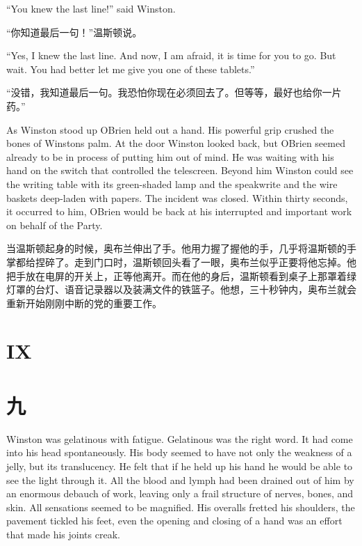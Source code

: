 \begin{paracol}{2}
\switchcolumn*

``You knew the last line!'' said Winston.

\switchcolumn

``你知道最后一句！''温斯顿说。

\switchcolumn*

``Yes, I knew the last line. And now, I am afraid, it is time for you to
go. But wait. You had better let me give you one of these tablets.''

\switchcolumn

``没错，我知道最后一句。我恐怕你现在必须回去了。但等等，最好也给你一片药。''

\switchcolumn*

As Winston stood up O\textquotesingle Brien held out a hand. His
powerful grip crushed the bones of Winston\textquotesingle s palm. At
the door Winston looked back, but O\textquotesingle Brien seemed already
to be in process of putting him out of mind. He was waiting with his
hand on the switch that controlled the telescreen. Beyond him Winston
could see the writing table with its green-shaded lamp and the
speakwrite and the wire baskets deep-laden with papers. The incident was
closed. Within thirty seconds, it occurred to him,
O\textquotesingle Brien would be back at his interrupted and important
work on behalf of the Party.

\switchcolumn

当温斯顿起身的时候，奥布兰伸出了手。他用力握了握他的手，几乎将温斯顿的手掌都给捏碎了。走到门口时，温斯顿回头看了一眼，奥布兰似乎正要将他忘掉。他把手放在电屏的开关上，正等他离开。而在他的身后，温斯顿看到桌子上那罩着绿灯罩的台灯、语音记录器以及装满文件的铁篮子。他想，三十秒钟内，奥布兰就会重新开始刚刚中断的党的重要工作。

\switchcolumn*


\section{IX}\label{ix}

\switchcolumn

\section*{九}\label{ux5341ux4e03}

\switchcolumn*

Winston was gelatinous with fatigue. Gelatinous was the right word. It
had come into his head spontaneously. His body seemed to have not only
the weakness of a jelly, but its translucency. He felt that if he held
up his hand he would be able to see the light through it. All the blood
and lymph had been drained out of him by an enormous debauch of work,
leaving only a frail structure of nerves, bones, and skin. All
sensations seemed to be magnified. His overalls fretted his shoulders,
the pavement tickled his feet, even the opening and closing of a hand
was an effort that made his joints creak.


\end{paracol}
